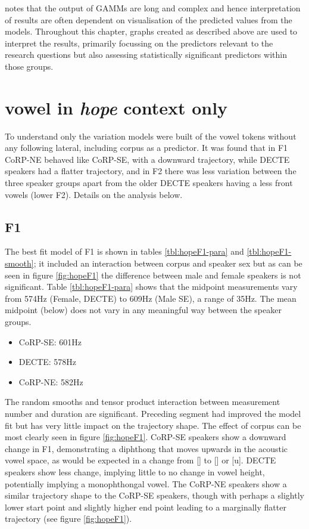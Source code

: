 \documentclass[../../../00.FullDoc/tex/Thesis]{subfiles}
\begin{document}
\citet{Stanley2021} notes that the output of GAMMs are long and complex and hence interpretation of results are often dependent on visualisation of the predicted values from the models. Throughout this chapter, graphs created as described above are used to interpret the results, primarily focussing on the predictors relevant to the research questions but also assessing statistically significant predictors within those groups.


\section{ vowel in \textit{hope} context only} \label{sec:GGhope}
To understand only the \hope{} variation models were built of the \goat{} vowel tokens without any following lateral, including corpus as a predictor. It was found that in F1 CoRP-NE behaved like CoRP-SE, with a downward trajectory, while DECTE speakers had a flatter trajectory, and in F2 there was less variation between the three speaker groups apart from the older DECTE speakers having a less front vowels (lower F2). Details on the analysis below.

\subsection{\hope{} F1} \label{subsec:hopeF1}
The best fit model of F1 is shown in tables \ref{tbl:hopeF1-para} and \ref{tbl:hopeF1-smooth}; it included an interaction between corpus and speaker sex but as can be seen in figure \ref{fig:hopeF1} the difference between male and female speakers is not significant. Table \ref{tbl:hopeF1-para} shows that the midpoint measurements vary from 574Hz (Female, DECTE) to 609Hz (Male SE), a range of 35Hz. The mean midpoint (below) does not vary in any meaningful way between the speaker groups.
\begin{itemize}
	\item CoRP-SE: 601Hz
	\item DECTE: 578Hz
	\item CoRP-NE: 582Hz
\end{itemize}
The random smooths and tensor product interaction between measurement number and duration are significant. Preceding segment had improved the model fit but has very little impact on the trajectory shape. The effect of corpus can be most clearly seen in figure \ref{fig:hopeF1}. CoRP-SE speakers show a downward change in F1, demonstrating a diphthong that moves upwards in the acoustic vowel space, as would be expected in a change from [\textschwa{}] to [\textbaru{}] or [u]. DECTE speakers show less change, implying little to no change in vowel height, potentially implying a monophthongal vowel. The CoRP-NE speakers show a similar trajectory shape to the CoRP-SE speakers, though with perhaps a slightly lower start point and slightly higher end point leading to a marginally flatter trajectory (see figure \ref{fig:hopeF1}).
\end{document}
